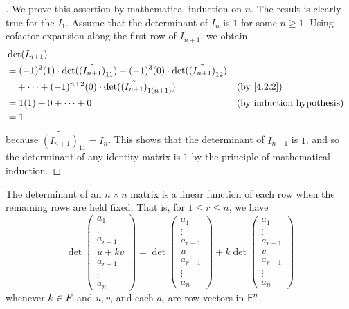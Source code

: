 \begin{proof}[]
  We prove this assertion by mathematical induction on \(n\).
  The result is clearly true for the \(I_1\).
  Assume that the determinant of \(I_n\) is \(1\) for some \(n \geq 1\).
  Using cofactor expansion along the first row of \(I_{n + 1}\), we obtain
  \begin{align*}
     & \det(I_{n + 1})                                                                                                                             \\
     & = (-1)^2 (1) \cdot \det(\tilde{(I_{n + 1})}_{1 1}) + (-1)^3 (0) \cdot \det(\tilde{(I_{n + 1})}_{1 2})                                       \\
     & \quad + \cdots  + (-1)^{n + 2} (0) \cdot \det(\tilde{(I_{n + 1})}_{1 (n + 1)})                        &  & \text{(by \cref{4.2.2})}         \\
     & = 1(1) + 0 + \cdots + 0                                                                               &  & \text{(by induction hypothesis)} \\
     & = 1
  \end{align*}
  because \(\tilde{(I_{n + 1})}_{1 1} = I_n\).
  This shows that the determinant of \(I_{n + 1}\) is \(1\), and so the determinant of any identity matrix is \(1\) by the principle of mathematical induction.
\end{proof}

\begin{thm}\label{4.3}
  The determinant of an \(n \times n\) matrix is a linear function of each row when the remaining rows are held fixed.
  That is, for \(1 \leq r \leq n\), we have
  \[
    \det\begin{pmatrix}
      a_1       \\
      \vdots    \\
      a_{r - 1} \\
      u + kv    \\
      a_{r + 1} \\
      \vdots    \\
      a_n
    \end{pmatrix} = \det\begin{pmatrix}
      a_1       \\
      \vdots    \\
      a_{r - 1} \\
      u         \\
      a_{r + 1} \\
      \vdots    \\
      a_n
    \end{pmatrix} + k \det\begin{pmatrix}
      a_1       \\
      \vdots    \\
      a_{r - 1} \\
      v         \\
      a_{r + 1} \\
      \vdots    \\
      a_n
    \end{pmatrix}
  \]
  whenever \(k \in \mathit{F}\) and \(u, v\), and each \(a_i\) are row vectors in \(\mathsf{F}^n\).
\end{thm}

